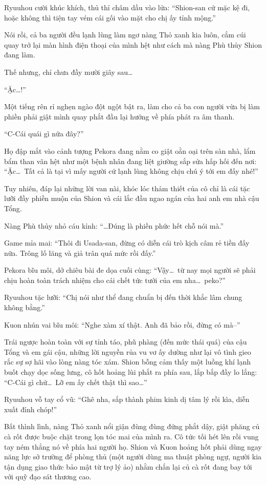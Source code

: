 \documentclass[../main.tex]{subfiles}
\begin{document}
Ryuuhou cười khúc khích, thủ thỉ châm dầu vào lửa: ``Shion-san cứ mặc kệ đi, hoặc không thì tiện tay vém cái gối vào mặt cho chị ấy tỉnh mộng.''

Nói rồi, cả ba người đều lạnh lùng làm ngơ nàng Thỏ xanh kia luôn, cắm cúi quay trở lại màn hình điện thoại của mình hệt như cách mà nàng Phù thủy Shion đang làm.

Thế nhưng, chỉ chưa đầy mười giây sau\dots

``Ặc\dots!''

Một tiếng rên rỉ nghẹn ngào đột ngột bật ra, làm cho cả ba con người vừa bị làm phiền phải giật mình quay phắt đầu lại hướng về phía phát ra âm thanh.

``C-Cái quái gì nữa đây?''

Họ đập mắt vào cảnh tượng Pekora đang nằm co giật oằn oại trên sàn nhà, lẩm bẩm than vãn hệt như một bệnh nhân đang liệt giường sắp sửa hấp hối đến nơi: ``Ặc\dots\ Tất cả là tại vì mấy người cứ lạnh lùng không chịu chú ý tới em đấy nhé!''


Tuy nhiên, đáp lại những lời van nài, khóc lóc thảm thiết của cô chỉ là cái tặc lưỡi đầy phiền muộn của Shion và cái lắc đầu ngao ngán của hai anh em nhà cậu Tổng.

Nàng Phù thủy nhỏ cáu kỉnh: ``\dots Đúng là phiền phức hết chỗ nói mà.''

Game mỉa mai: ``Thôi đi Usada-san, đừng có diễn cái trò kịch câm rẻ tiền đấy nữa. Trông lố lăng và giả trân quá mức rồi đấy.''

Pekora bĩu môi, dở chiêu bài đe dọa cuối cùng: ``Vậy\dots\ từ nay mọi người sẽ phải chịu hoàn toàn trách nhiệm cho cái chết tức tưởi của em nha\dots\ peko?''

Ryuuhou tặc lưỡi: ``Chị nói như thể đang chuẩn bị đến thời khắc lâm chung không bằng.''

Kuon nhún vai bĩu môi: ``Nghe xàm xí thật. Anh đã bảo rồi, đừng có mà--''

Trái ngược hoàn toàn với sự tỉnh táo, phũ phàng (đến mức thái quá) của cậu Tổng và em gái cậu, những lời nguyền rủa vu vơ ấy dường như lại vô tình gieo rắc sự sợ hãi vào lòng nàng tóc xám. Shion bỗng cảm thấy một luồng khí lạnh buốt chạy dọc sống lưng, cô hốt hoảng lùi phắt ra phía sau, lắp bắp đầy lo lắng: ``C-Cái gì chứ\dots\ Lỡ em ấy chết thật thì sao\dots''

Ryuuhou vỗ tay cổ vũ: ``Ghê nha, sắp thành phim kinh dị tâm lý rồi kìa, diễn xuất đỉnh chóp!''

Bất thình lình, nàng Thỏ xanh nổi giận đùng đùng đứng phắt dậy, giật phăng củ cà rốt được buộc chặt trong lọn tóc mai của mình ra. Cô tức tối hét lên rồi vung tay ném thẳng nó về phía hai người họ. Shion và Kuon hoảng hốt phải dùng ngay năng lực sở trường để phòng thủ (một người dùng ma thuật phòng ngự, người kia tận dụng giao thức bảo mật từ trợ lý ảo) nhằm chắn lại củ cà rốt đang bay tới với quỹ đạo sát thương cao.
\end{document}
